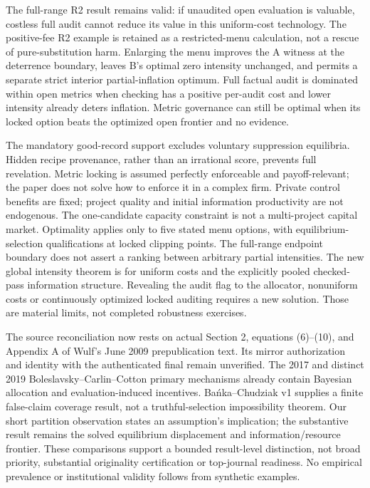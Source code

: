 \documentclass[11pt]{article}
\begin{document}
The full-range R2 result remains valid: if unaudited open evaluation is valuable, costless full audit cannot reduce its value in this uniform-cost technology. The positive-fee R2 example is retained as a restricted-menu calculation, not a rescue of pure-substitution harm. Enlarging the menu improves the A witness at the deterrence boundary, leaves B's optimal zero intensity unchanged, and permits a separate strict interior partial-inflation optimum. Full factual audit is dominated within open metrics when checking has a positive per-audit cost and lower intensity already deters inflation. Metric governance can still be optimal when its locked option beats the optimized open frontier and no evidence.

The mandatory good-record support excludes voluntary suppression equilibria. Hidden recipe provenance, rather than an irrational score, prevents full revelation. Metric locking is assumed perfectly enforceable and payoff-relevant; the paper does not solve how to enforce it in a complex firm. Private control benefits are fixed; project quality and initial information productivity are not endogenous. The one-candidate capacity constraint is not a multi-project capital market. Optimality applies only to five stated menu options, with equilibrium-selection qualifications at locked clipping points. The full-range endpoint boundary does not assert a ranking between arbitrary partial intensities. The new global intensity theorem is for uniform costs and the explicitly pooled checked-pass information structure. Revealing the audit flag to the allocator, nonuniform costs or continuously optimized locked auditing requires a new solution. Those are material limits, not completed robustness exercises.

The source reconciliation now rests on actual Section 2, equations (6)--(10), and Appendix A of Wulf's June 2009 prepublication text. Its mirror authorization and identity with the authenticated final remain unverified. The 2017 and distinct 2019 Boleslavsky--Carlin--Cotton primary mechanisms already contain Bayesian allocation and evaluation-induced incentives. Ba\'nka--Chudziak v1 supplies a finite false-claim coverage result, not a truthful-selection impossibility theorem. Our short partition observation states an assumption's implication; the substantive result remains the solved equilibrium displacement and information/resource frontier. These comparisons support a bounded result-level distinction, not broad priority, substantial originality certification or top-journal readiness. No empirical prevalence or institutional validity follows from synthetic examples.
\end{document}
